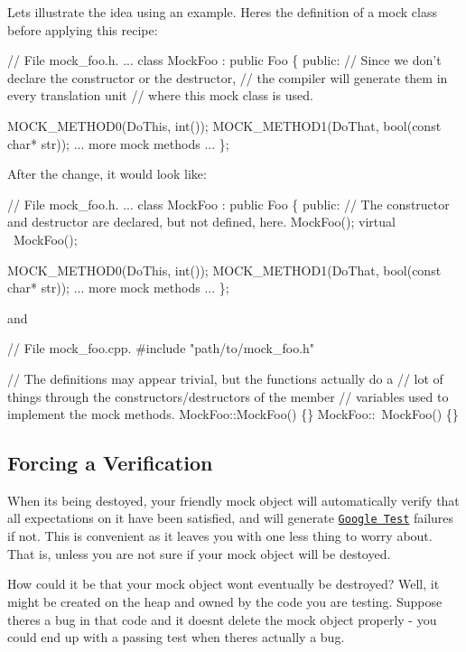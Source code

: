 Let\textquotesingle{}s illustrate the idea using an example. Here\textquotesingle{}s the definition of a mock class before applying this recipe\+:


\begin{DoxyCode}
// File mock\_foo.h.
...
class MockFoo : public Foo \{
 public:
  // Since we don't declare the constructor or the destructor,
  // the compiler will generate them in every translation unit
  // where this mock class is used.

  MOCK\_METHOD0(DoThis, int());
  MOCK\_METHOD1(DoThat, bool(const char* str));
  ... more mock methods ...
\};
\end{DoxyCode}


After the change, it would look like\+:


\begin{DoxyCode}
// File mock\_foo.h.
...
class MockFoo : public Foo \{
 public:
  // The constructor and destructor are declared, but not defined, here.
  MockFoo();
  virtual ~MockFoo();

  MOCK\_METHOD0(DoThis, int());
  MOCK\_METHOD1(DoThat, bool(const char* str));
  ... more mock methods ...
\};
\end{DoxyCode}
 and 
\begin{DoxyCode}
// File mock\_foo.cpp.
#include "path/to/mock\_foo.h"

// The definitions may appear trivial, but the functions actually do a
// lot of things through the constructors/destructors of the member
// variables used to implement the mock methods.
MockFoo::MockFoo() \{\}
MockFoo::~MockFoo() \{\}
\end{DoxyCode}


\subsection*{Forcing a Verification}

When it\textquotesingle{}s being destoyed, your friendly mock object will automatically verify that all expectations on it have been satisfied, and will generate \href{http://code.google.com/p/googletest/}{\tt Google Test} failures if not. This is convenient as it leaves you with one less thing to worry about. That is, unless you are not sure if your mock object will be destoyed.

How could it be that your mock object won\textquotesingle{}t eventually be destroyed? Well, it might be created on the heap and owned by the code you are testing. Suppose there\textquotesingle{}s a bug in that code and it doesn\textquotesingle{}t delete the mock object properly -\/ you could end up with a passing test when there\textquotesingle{}s actually a bug.

